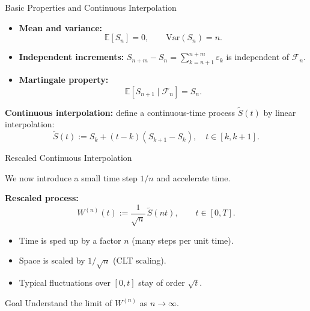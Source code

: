 \documentclass[10pt,aspectratio=169]{beamer}
\begin{document}
\begin{frame}{Basic Properties and Continuous Interpolation}

\begin{itemize}
  \item \textbf{Mean and variance:}\pause
  \[
  \mathbb{E}[S_n]=0,
  \qquad
  \mathrm{Var}(S_n)=n.
  \]
  \item \textbf{Independent increments:}\pause
  \(S_{n+m}-S_n = \sum_{k=n+1}^{n+m}\varepsilon_k\) is independent of \(\mathcal{F}_n\).\pause
  \item \textbf{Martingale property:}\pause
  \[
  \mathbb{E}[S_{n+1}\mid \mathcal{F}_n]=S_n.
  \]
\end{itemize}
\pause
\medskip

\textbf{Continuous interpolation:}\pause\;
define a continuous-time process \(\widetilde S(t)\) by linear interpolation:
\[
\widetilde S(t) := S_k + (t-k)(S_{k+1}-S_k),
\quad t\in[k,k+1].
\]

\end{frame}

\begin{frame}{Rescaled Continuous Interpolation}

We now introduce a small time step \(1/n\) and accelerate time.\pause

\medskip
\textbf{Rescaled process:}\pause
\[
W^{(n)}(t)
:=
\frac{1}{\sqrt{n}}\,
\widetilde S(nt),
\qquad t\in[0,T].
\]
\pause

\begin{itemize}
  \item Time is sped up by a factor \(n\) (many steps per unit time).\pause
  \item Space is scaled by \(1/\sqrt{n}\) (CLT scaling).\pause
  \item Typical fluctuations over \([0,t]\) stay of order \(\sqrt{t}\).\pause
\end{itemize}

\medskip
\begin{block}{Goal}
Understand the limit of \(W^{(n)}\) as \(n\to\infty\).
\end{block}

\end{frame}
\end{document}
